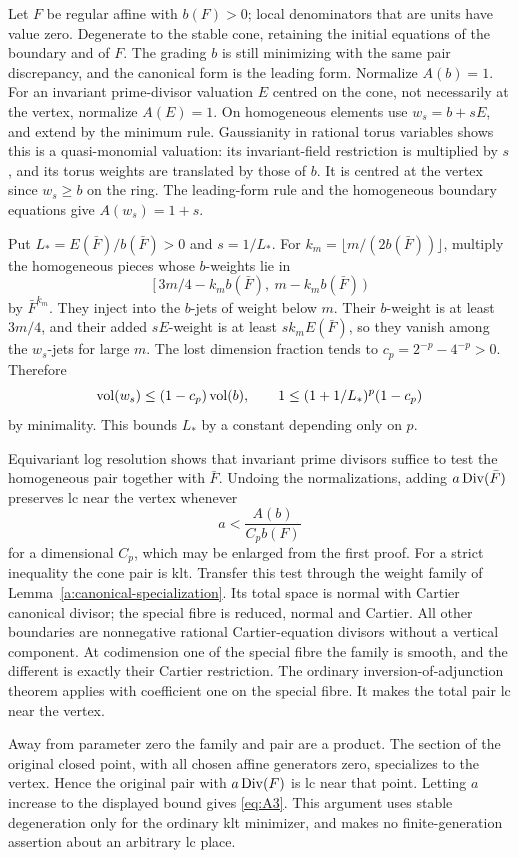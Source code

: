 Let \(F\) be regular affine with \(b(F)>0\); local denominators that are
units have value zero. Degenerate to the stable cone, retaining the
initial equations of the boundary and of \(F\).
The grading \(b\) is still minimizing with the same pair discrepancy,
and the canonical form is the leading form.
Normalize \(A(b)=1\). For an invariant prime-divisor valuation \(E\)
centred on the cone, not necessarily at the vertex, normalize \(A(E)=1\).
On homogeneous elements use \(w_s=b+sE\), and extend by the minimum rule.
Gaussianity in rational torus variables shows this is a quasi-monomial
valuation: its invariant-field restriction is multiplied by \(s\), and
its torus weights are translated by those of \(b\).
It is centred at the vertex since \(w_s\geq b\) on the ring.
The leading-form rule and the homogeneous boundary equations give
\(A(w_s)=1+s\).

Put \(L_*=E(\bar F)/b(\bar F)>0\) and \(s=1/L_*\).
For \(k_m=\lfloor m/(2b(\bar F))\rfloor\), multiply the homogeneous
pieces whose \(b\)-weights lie in
\[
 [\,3m/4-k_m b(\bar F),\ m-k_m b(\bar F)\,)
\]
by \(\bar F^{k_m}\).
They inject into the \(b\)-jets of weight below \(m\).
Their \(b\)-weight is at least \(3m/4\), and their added \(sE\)-weight
is at least \(s k_m E(\bar F)\), so they vanish among the \(w_s\)-jets
for large \(m\). The lost dimension fraction tends to
\(c_p=2^{-p}-4^{-p}>0\). Therefore
\[
 \operatorname{vol}(w_s)\leq(1-c_p)\operatorname{vol}(b),\qquad
 1\leq (1+1/L_*)^p(1-c_p)
\]
by minimality. This bounds \(L_*\) by a constant depending only on \(p\).

Equivariant log resolution shows that invariant prime divisors suffice
to test the homogeneous pair together with \(\bar F\). Undoing the
normalizations, adding \(a\operatorname{Div}(\bar F)\) preserves lc near the vertex
whenever
\[
                      a<\frac{A(b)}{C_p b(F)}
\]
for a dimensional \(C_p\), which may be enlarged from the first proof.
For a strict inequality the cone pair is klt.
Transfer this test through the weight family of
Lemma~\ref{a:canonical-specialization}. Its total space is normal with
Cartier canonical divisor; the special fibre is reduced, normal and
Cartier. All other boundaries are nonnegative rational Cartier-equation
divisors without a vertical component. At codimension one of the
special fibre the family is smooth, and the different is exactly their
Cartier restriction. The ordinary inversion-of-adjunction theorem
\cite[Theorem on p.~1]{Kawakita} applies with coefficient one on the
special fibre. It makes the total pair lc near the vertex.

Away from parameter zero the family and pair are a product. The section
of the original closed point, with all chosen affine generators zero,
specializes to the vertex. Hence the original pair with \(a\operatorname{Div}(F)\)
is lc near that point. Letting \(a\) increase to the displayed bound
gives \eqref{eq:A3}. This argument uses stable degeneration only for
the ordinary klt minimizer, and makes no finite-generation assertion
about an arbitrary lc place.
